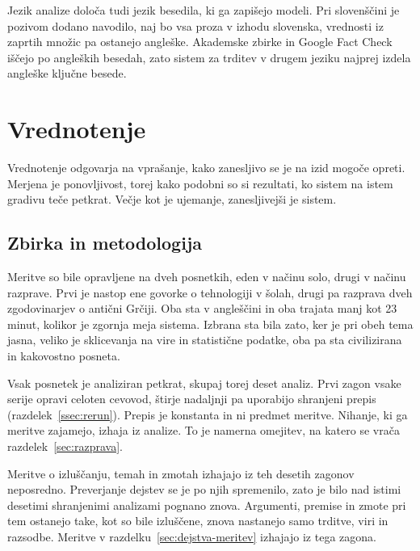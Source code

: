 \documentclass[a4paper, 12pt]{book}
\begin{document}
Jezik analize določa tudi jezik besedila, ki ga zapišejo modeli. Pri slovenščini je pozivom dodano navodilo, naj bo vsa proza v izhodu slovenska, vrednosti iz zaprtih množic pa ostanejo angleške. Akademske zbirke in Google Fact Check iščejo po angleških besedah, zato sistem za trditev v drugem jeziku najprej izdela angleške ključne besede.



\chapter{Vrednotenje}
\label{ch:vrednotenje}

Vrednotenje odgovarja na vprašanje, kako zanesljivo se je na izid mogoče
opreti. Merjena je ponovljivost, torej kako podobni so si rezultati, ko sistem
na istem gradivu teče petkrat. Večje kot je ujemanje, zanesljivejši je sistem.

\section{Zbirka in metodologija}
\label{sec:zbirka}

Meritve so bile opravljene na dveh posnetkih, eden v načinu solo, drugi v načinu
razprave. Prvi je nastop ene govorke o tehnologiji v šolah, drugi pa razprava
dveh zgodovinarjev o antični Grčiji. Oba sta v angleščini in oba trajata manj
kot 23 minut, kolikor je zgornja meja sistema.
Izbrana sta bila zato, ker je pri obeh tema jasna, veliko je
sklicevanja na vire in statistične podatke, oba pa sta civilizirana in
kakovostno posneta.

Vsak posnetek je analiziran petkrat, skupaj torej deset analiz. Prvi zagon vsake
serije opravi celoten cevovod, štirje nadaljnji pa uporabijo shranjeni prepis
(razdelek~\ref{ssec:rerun}). Prepis je konstanta in ni predmet meritve. Nihanje,
ki ga meritve zajamejo, izhaja iz analize. To je namerna omejitev, na katero se
vrača razdelek~\ref{sec:razprava}.

Meritve o izluščanju, temah in zmotah izhajajo iz teh desetih zagonov
neposredno. Preverjanje dejstev se je po njih spremenilo, zato je bilo nad istimi
desetimi shranjenimi analizami pognano znova. Argumenti, premise in zmote pri tem
ostanejo take, kot so bile izluščene, znova nastanejo samo trditve, viri in
razsodbe. Meritve v razdelku~\ref{sec:dejstva-meritev} izhajajo iz tega zagona.
\end{document}
